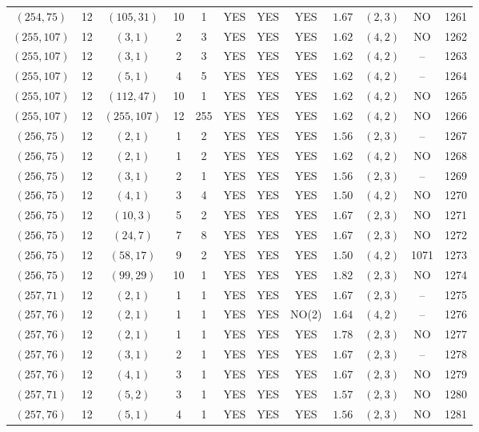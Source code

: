 \begin{longtable}{|c|c|c|c|c|c|c|c|c|c|c|c|}
$(254,75)$ & 12 & $(105,31)$ & 10 & 1 & YES & YES & YES & $1.67$ & $(2,3)$ & NO & 1261\\
$(255,107)$ & 12 & $(3,1)$ & 2 & 3 & YES & YES & YES & $1.62$ & $(4,2)$ & NO & 1262\\
$(255,107)$ & 12 & $(3,1)$ & 2 & 3 & YES & YES & YES & $1.62$ & $(4,2)$ & -- & 1263\\
$(255,107)$ & 12 & $(5,1)$ & 4 & 5 & YES & YES & YES & $1.62$ & $(4,2)$ & -- & 1264\\
$(255,107)$ & 12 & $(112,47)$ & 10 & 1 & YES & YES & YES & $1.62$ & $(4,2)$ & NO & 1265\\
$(255,107)$ & 12 & $(255,107)$ & 12 & 255 & YES & YES & YES & $1.62$ & $(4,2)$ & NO & 1266\\
$(256,75)$ & 12 & $(2,1)$ & 1 & 2 & YES & YES & YES & $1.56$ & $(2,3)$ & -- & 1267\\
$(256,75)$ & 12 & $(2,1)$ & 1 & 2 & YES & YES & YES & $1.62$ & $(4,2)$ & NO & 1268\\
$(256,75)$ & 12 & $(3,1)$ & 2 & 1 & YES & YES & YES & $1.56$ & $(2,3)$ & -- & 1269\\
$(256,75)$ & 12 & $(4,1)$ & 3 & 4 & YES & YES & YES & $1.50$ & $(4,2)$ & NO & 1270\\
$(256,75)$ & 12 & $(10,3)$ & 5 & 2 & YES & YES & YES & $1.67$ & $(2,3)$ & NO & 1271\\
$(256,75)$ & 12 & $(24,7)$ & 7 & 8 & YES & YES & YES & $1.67$ & $(2,3)$ & NO & 1272\\
$(256,75)$ & 12 & $(58,17)$ & 9 & 2 & YES & YES & YES & $1.50$ & $(4,2)$ & 1071 & 1273\\
$(256,75)$ & 12 & $(99,29)$ & 10 & 1 & YES & YES & YES & $1.82$ & $(2,3)$ & NO & 1274\\
$(257,71)$ & 12 & $(2,1)$ & 1 & 1 & YES & YES & YES & $1.67$ & $(2,3)$ & -- & 1275\\
$(257,76)$ & 12 & $(2,1)$ & 1 & 1 & YES & YES & NO(2) & $1.64$ & $(4,2)$ & -- & 1276\\
$(257,76)$ & 12 & $(2,1)$ & 1 & 1 & YES & YES & YES & $1.78$ & $(2,3)$ & NO & 1277\\
$(257,76)$ & 12 & $(3,1)$ & 2 & 1 & YES & YES & YES & $1.67$ & $(2,3)$ & -- & 1278\\
$(257,76)$ & 12 & $(4,1)$ & 3 & 1 & YES & YES & YES & $1.67$ & $(2,3)$ & NO & 1279\\
$(257,71)$ & 12 & $(5,2)$ & 3 & 1 & YES & YES & YES & $1.57$ & $(2,3)$ & NO & 1280\\
$(257,76)$ & 12 & $(5,1)$ & 4 & 1 & YES & YES & YES & $1.56$ & $(2,3)$ & NO & 1281\\

\end{longtable}
